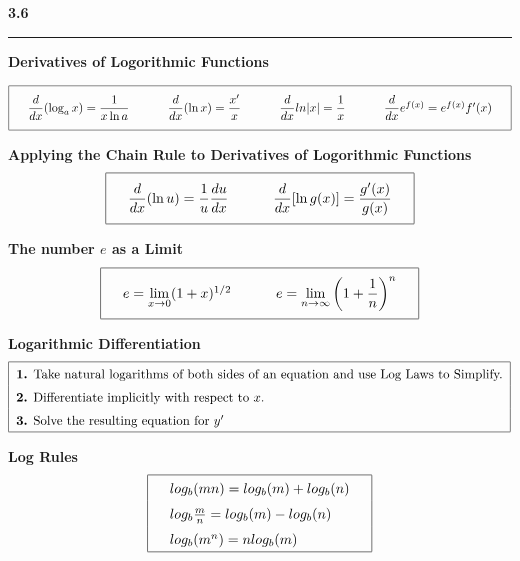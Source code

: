\documentclass{article}
\begin{document}
\begin{center}
\Large\textbf{3.6}

\noindent\hfill\rule{0.3\textwidth}{.4pt}\hfill
\vspace{16pt}

\large\textbf{Derivatives of Logorithmic Functions}
\begin{large}
\[\arraycolsep=16pt\def\arraystretch{2.5}
\begin{array}{| l l l l|}
	\hline
	\dfrac{d}{dx} (\log_a x) = \dfrac{1}{x \ln a} & \dfrac{d}{dx} (\ln x) = \dfrac{x'}{x} & \dfrac{d}{dx} ln |x| = \dfrac{1}{x} & \dfrac{d}{dx} e^{f(x)} = e^{f(x)} f'(x) \\
	[\medskipamount]	
	\hline
\end{array}
\]
\vspace{16pt}

\large\textbf{Applying the Chain Rule to Derivatives of Logorithmic Functions}
\[\arraycolsep=16pt\def\arraystretch{2.5}
\begin{array}{| l l |}
	\hline
	\dfrac{d}{dx} (\ln u) = \dfrac{1}{u} \dfrac{du}{dx} & \dfrac{d}{dx} [\ln g(x)] = \dfrac{g'(x)}{g(x)} \\
	[\medskipamount]	
	\hline
\end{array}
\]
\vspace{16pt}

\large\textbf{The number $e$ as a Limit}
\[\arraycolsep=16pt\def\arraystretch{2.5}
\begin{array}{| l l |}
	\hline
	e = \underset{x \to 0}{\lim} (1+x)^{1/2} & e = \underset{n \to \infty}{\lim} \left(1+\dfrac{1}{n}\right)^n \\
	[\medskipamount]	
	\hline
\end{array}
\]
\vspace{16pt}

\large\textbf{Logarithmic Differentiation}
\[\arraycolsep=16pt\def\arraystretch{1.5}
\begin{tabular}{| l |}
	\hline
	\textbf{1.} Take natural logarithms of both sides of an equation and use Log Laws to Simplify. \\
	\textbf{2.} Differentiate implicitly with respect to $x$. \\
	\textbf{3.} Solve the resulting equation for $y'$ \\
	\hline
\end{tabular}
\]
\vspace{16pt}

\large\textbf{Log Rules}
\[\arraycolsep=16pt\def\arraystretch{1.5}
\begin{array}{| l |}
	\hline
	log_b (mn) = log_b(m) + log_b(n) \\
	log_b \frac{m}{n} = log_b(m) - log_b(n) \\
	log_b (m^n) = n log_b(m) \\	
	\hline
\end{array}
\]
\vspace{16pt}
\end{large}
\end{center}
\pagebreak
\end{document}
